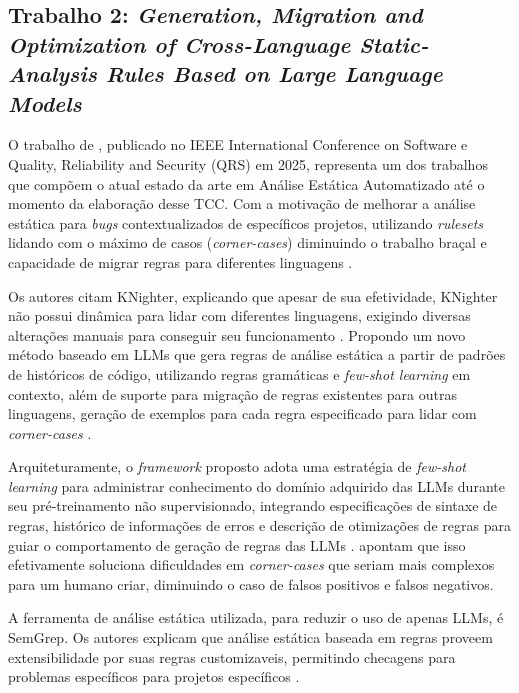 \documentclass[
    12pt,                %
    openright,           %
    oneside,             %
    a4paper,             %
    english,             %
    brazil               %
]{abntex2}
\begin{document}
\begin{itemize}
\subsection{Trabalho 2: \textit{Generation, Migration and Optimization of Cross-Language Static-Analysis Rules Based on Large Language Models} \cite{hou2025generation}}
\par
O trabalho de , publicado no IEEE International Conference on Software e Quality, Reliability and Security (QRS) em 2025, representa um dos trabalhos que compõem o atual estado da arte em Análise Estática Automatizado até o momento da elaboração desse TCC.
Com a motivação de melhorar a análise estática para \textit{bugs} contextualizados de específicos projetos, utilizando \textit{rulesets} lidando com o máximo de casos (\textit{corner-cases}) diminuindo o trabalho braçal e capacidade de migrar regras para diferentes linguagens \cite{hou2025generation}.
\par
Os autores citam KNighter, explicando que apesar de sua efetividade, KNighter não possui dinâmica para lidar com diferentes linguagens, exigindo diversas alterações manuais para conseguir seu funcionamento \cite{hou2025generation}.
Propondo um novo método baseado em LLMs que gera regras de análise estática a partir de padrões de históricos de código, utilizando regras gramáticas e \textit{few-shot learning} em contexto, além de suporte para migração de regras existentes para outras linguagens, geração de exemplos para cada regra especificado para lidar com \textit{corner-cases} \cite{hou2025generation}.
\par
Arquiteturamente, o \textit{framework} proposto adota uma estratégia de \textit{few-shot learning} para administrar conhecimento do domínio adquirido das LLMs durante seu pré-treinamento não supervisionado, integrando especificações de sintaxe de regras, histórico de informações de erros e descrição de otimizações de regras para guiar o comportamento de geração de regras das LLMs \cite{hou2025generation}.
 apontam que isso efetivamente soluciona dificuldades em \textit{corner-cases} que seriam mais complexos para um humano criar, diminuindo o caso de falsos positivos e falsos negativos.
\par
A ferramenta de análise estática utilizada, para reduzir o uso de apenas LLMs, é SemGrep.
Os autores explicam que análise estática baseada em regras proveem extensibilidade por suas regras customizaveis, permitindo checagens para problemas específicos para projetos específicos \cite{hou2025generation}.

\end{itemize}
\end{document}
